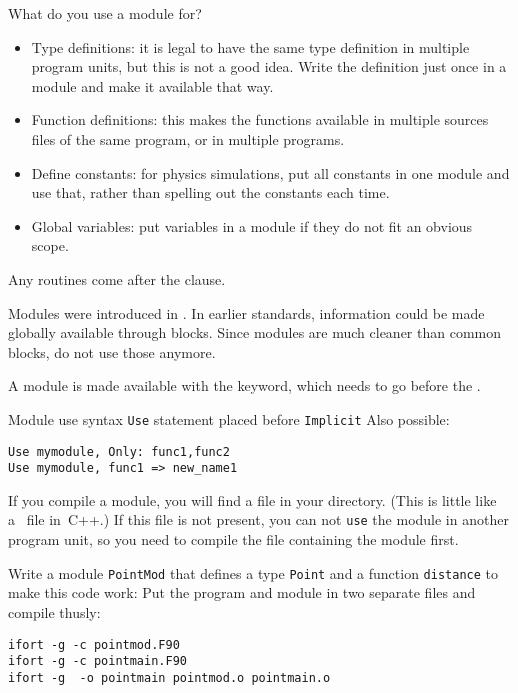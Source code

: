 What do you use a module for?
\begin{itemize}
\item Type definitions: it is legal to have the same type definition
  in multiple program units, but this is not a good idea. 
  Write the definition just once in a module and make it available
  that way.
\item Function definitions: this makes the functions available in multiple
  sources files of the same program, or in multiple programs.
\item Define constants: for physics simulations, put all constants in
  one module and use that, rather than spelling out the constants each
  time.
\item Global variables: put variables in a module if they do not fit
  an obvious scope.
\end{itemize}
Any routines come after the 
clause.

\begin{remark}
  Modules were introduced in .
  In earlier standards, information could be made globally available
  through  blocks. 
  Since modules are much cleaner than common blocks, do not use those anymore.
\end{remark}

A module is made available with the  keyword, which
needs to go before the .
%
\begin{block}{Module use syntax}
  \label{sl:moduleuse}
  \lstinline{Use} statement placed before \lstinline{Implicit}
  Also possible:
\begin{lstlisting}
Use mymodule, Only: func1,func2
Use mymodule, func1 => new_name1
\end{lstlisting}
\end{block}

If you compile a module, you will find a  file in your
directory. (This is little like a~ file in~C++.)
If this file is not present, you can not \lstinline{use} the module in another
program unit, so you need to compile the file containing the module
first.

\begin{exercise}
  \label{ex:fpointmod}
  Write a module \lstinline{PointMod} that defines a type \lstinline{Point} and a
  function \lstinline{distance} to make this code work:
  Put the program and module in two separate files and compile thusly:
\begin{lstlisting}
ifort -g -c pointmod.F90
ifort -g -c pointmain.F90
ifort -g  -o pointmain pointmod.o pointmain.o 
\end{lstlisting}
\end{exercise}

